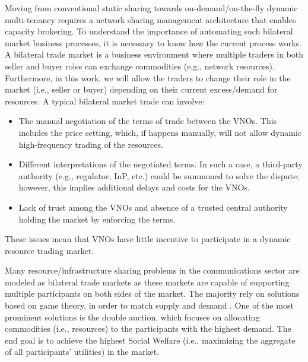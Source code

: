 Moving from conventional static sharing towards on-demand/on-the-fly dynamic multi-tenancy \cite{7514161} requires a network sharing management architecture that enables capacity brokering. To understand the importance of automating such bilateral market business processes, it is necessary to know how the current process works. 
A bilateral trade market is a business environment where multiple traders in both seller and buyer roles can exchange commodities (e.g., network resources). Furthermore, in this work, we will allow the traders to change their role in the market (i.e., seller or buyer) depending on their current excess/demand for resources.
A typical bilateral market trade can involve: 
\begin{itemize}
    \item The manual negotiation of the terms of trade between the \acp{VNO}. This includes the price setting, which, if happens manually, will not allow dynamic high-frequency trading of the resources.
    \item Different interpretations of the negotiated terms. In such a case, a third-party authority (e.g., regulator, \ac{InP}, etc.) could be summoned to solve the dispute; however, this implies additional delays and costs for the \acp{VNO}.
    \item Lack of trust among the \acp{VNO} and absence of a trusted central authority holding the market by enforcing the terms. 
\end{itemize}

These issues mean that \acp{VNO} have little incentive to participate in a dynamic resource trading market.



Many resource/infrastructure sharing problems in the communications sector are modeled as bilateral trade markets as these markets are capable of supporting multiple participants on both sides of the market. The majority rely on solutions based on game theory, in order to match supply and demand \cite{8542782,8665886,8664672,8395445,8488596}. One of the most prominent solutions is the double auction, which focuses on allocating commodities (i.e., resources) to the participants with the highest demand. The end goal is to achieve the highest Social Welfare (i.e., maximizing the aggregate of all participants' utilities) in the market. 

